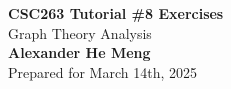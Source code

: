 \begin{titlepage}
    \null %
    \vfill
    \begin{center}
        {\fontsize{35}{48}\selectfont \bfseries CSC263 Tutorial \#8 Exercises}
        \vspace{20pt} \\
        {\LARGE Graph Theory Analysis} \\
        \vspace{20pt}
        \textbf{Alexander He Meng}
        \vspace{8pt}
        \\ Prepared for March 14th, 2025
    \end{center}
    \vfill
\end{titlepage}
